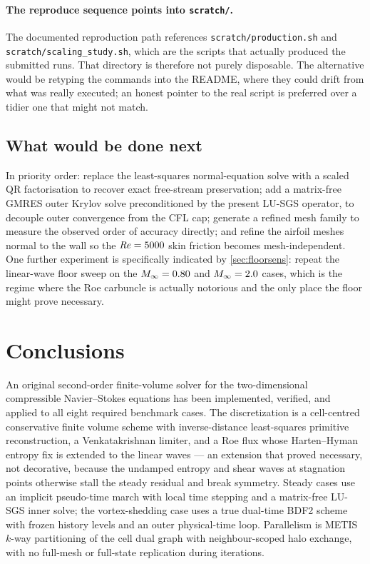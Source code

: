 \paragraph{The reproduce sequence points into \texttt{scratch/}.} The documented
reproduction path references \texttt{scratch/production.sh} and
\texttt{scratch/scaling\_study.sh}, which are the scripts that actually produced
the submitted runs. That directory is therefore not purely disposable. The
alternative would be retyping the commands into the README, where they could drift
from what was really executed; an honest pointer to the real script is preferred
over a tidier one that might not match.

\subsection{What would be done next}

In priority order: replace the least-squares normal-equation solve with a scaled
QR factorisation to recover exact free-stream preservation; add a matrix-free
GMRES outer Krylov solve preconditioned by the present LU-SGS operator, to
decouple outer convergence from the CFL cap; generate a refined mesh family to
measure the observed order of accuracy directly; and refine the airfoil meshes
normal to the wall so the $\mathit{Re}=5000$ skin friction becomes mesh-independent.
One further experiment is specifically indicated by \cref{sec:floorsens}: repeat
the linear-wave floor sweep on the $M_\infty=0.80$ and $M_\infty=2.0$ cases, which is
the regime where the Roe carbuncle is actually notorious and the only place the
floor might prove necessary.

\section{Conclusions}
\label{sec:conclusions}

An original second-order finite-volume solver for the two-dimensional compressible
Navier--Stokes equations has been implemented, verified, and applied to all eight
required benchmark cases. The discretization is a cell-centred conservative finite
volume scheme with inverse-distance least-squares primitive reconstruction, a
Venkatakrishnan limiter, and a Roe flux whose Harten--Hyman entropy fix is extended
to the linear waves --- an extension that proved necessary, not decorative, because
the undamped entropy and shear waves at stagnation points otherwise stall the
steady residual and break symmetry. Steady cases use an implicit pseudo-time march
with local time stepping and a matrix-free LU-SGS inner solve; the vortex-shedding
case uses a true dual-time BDF2 scheme with frozen history levels and an outer
physical-time loop. Parallelism is METIS $k$-way partitioning of the cell dual
graph with neighbour-scoped halo exchange, with no full-mesh or full-state
replication during iterations.

